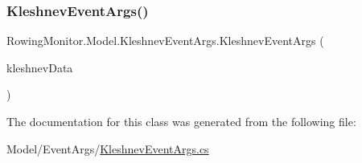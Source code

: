 \subsubsection{\texorpdfstring{Kleshnev\+Event\+Args()}{KleshnevEventArgs()}}
{\footnotesize\ttfamily Rowing\+Monitor.\+Model.\+Kleshnev\+Event\+Args.\+Kleshnev\+Event\+Args (\begin{DoxyParamCaption}\item[{List$<$ \hyperlink{struct_rowing_monitor_1_1_model_1_1_pipeline_1_1_kleshnev_data}{Kleshnev\+Data} $>$}]{kleshnev\+Data }\end{DoxyParamCaption})}



The documentation for this class was generated from the following file\+:\begin{DoxyCompactItemize}
\item 
Model/\+Event\+Args/\hyperlink{_kleshnev_event_args_8cs}{Kleshnev\+Event\+Args.\+cs}\end{DoxyCompactItemize}
